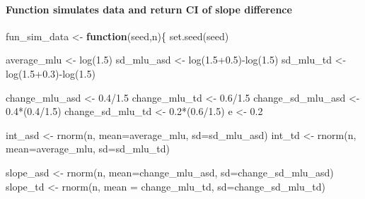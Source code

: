 \documentclass[
]{article}
\newenvironment{Shaded}{\begin{snugshade}}{\end{snugshade}}
\newcommand{\AttributeTok}[1]{\textcolor[rgb]{0.77,0.63,0.00}{#1}}
\newcommand{\ControlFlowTok}[1]{\textcolor[rgb]{0.13,0.29,0.53}{\textbf{#1}}}
\newcommand{\FloatTok}[1]{\textcolor[rgb]{0.00,0.00,0.81}{#1}}
\newcommand{\FunctionTok}[1]{\textcolor[rgb]{0.00,0.00,0.00}{#1}}
\newcommand{\NormalTok}[1]{#1}
\newcommand{\OtherTok}[1]{\textcolor[rgb]{0.56,0.35,0.01}{#1}}
\newcommand{\SpecialCharTok}[1]{\textcolor[rgb]{0.00,0.00,0.00}{#1}}
\begin{document}
\hypertarget{function-simulates-data-and-return-ci-of-slope-difference}{%
\paragraph{Function simulates data and return CI of slope
difference}\label{function-simulates-data-and-return-ci-of-slope-difference}}

\begin{Shaded}
\begin{Highlighting}[]
\NormalTok{ fun\_sim\_data }\OtherTok{\textless{}{-}} \ControlFlowTok{function}\NormalTok{(seed,n)\{}
   \FunctionTok{set.seed}\NormalTok{(seed)}
   
\NormalTok{   average\_mlu }\OtherTok{\textless{}{-}} \FunctionTok{log}\NormalTok{(}\FloatTok{1.5}\NormalTok{)}
\NormalTok{ sd\_mlu\_asd }\OtherTok{\textless{}{-}} \FunctionTok{log}\NormalTok{(}\FloatTok{1.5+0.5}\NormalTok{)}\SpecialCharTok{{-}}\FunctionTok{log}\NormalTok{(}\FloatTok{1.5}\NormalTok{)}
\NormalTok{ sd\_mlu\_td }\OtherTok{\textless{}{-}} \FunctionTok{log}\NormalTok{(}\FloatTok{1.5+0.3}\NormalTok{)}\SpecialCharTok{{-}}\FunctionTok{log}\NormalTok{(}\FloatTok{1.5}\NormalTok{)}
 
\NormalTok{ change\_mlu\_asd }\OtherTok{\textless{}{-}} \FloatTok{0.4}\SpecialCharTok{/}\FloatTok{1.5}
\NormalTok{ change\_mlu\_td }\OtherTok{\textless{}{-}} \FloatTok{0.6}\SpecialCharTok{/}\FloatTok{1.5}
\NormalTok{ change\_sd\_mlu\_asd }\OtherTok{\textless{}{-}} \FloatTok{0.4}\SpecialCharTok{*}\NormalTok{(}\FloatTok{0.4}\SpecialCharTok{/}\FloatTok{1.5}\NormalTok{)}
\NormalTok{ change\_sd\_mlu\_td }\OtherTok{\textless{}{-}} \FloatTok{0.2}\SpecialCharTok{*}\NormalTok{(}\FloatTok{0.6}\SpecialCharTok{/}\FloatTok{1.5}\NormalTok{)}
\NormalTok{ e }\OtherTok{\textless{}{-}} \FloatTok{0.2}
 
\NormalTok{ int\_asd }\OtherTok{\textless{}{-}} \FunctionTok{rnorm}\NormalTok{(n, }\AttributeTok{mean=}\NormalTok{average\_mlu, }\AttributeTok{sd=}\NormalTok{sd\_mlu\_asd)}
\NormalTok{int\_td }\OtherTok{\textless{}{-}} \FunctionTok{rnorm}\NormalTok{(n, }\AttributeTok{mean=}\NormalTok{average\_mlu, }\AttributeTok{sd=}\NormalTok{sd\_mlu\_td)}

\NormalTok{slope\_asd }\OtherTok{\textless{}{-}} \FunctionTok{rnorm}\NormalTok{(n, }\AttributeTok{mean=}\NormalTok{change\_mlu\_asd, }\AttributeTok{sd=}\NormalTok{change\_sd\_mlu\_asd)}
\NormalTok{slope\_td }\OtherTok{\textless{}{-}} \FunctionTok{rnorm}\NormalTok{(n, }\AttributeTok{mean =}\NormalTok{ change\_mlu\_td, }\AttributeTok{sd=}\NormalTok{change\_sd\_mlu\_td)}




\end{Highlighting}
\end{Shaded}
\end{document}
